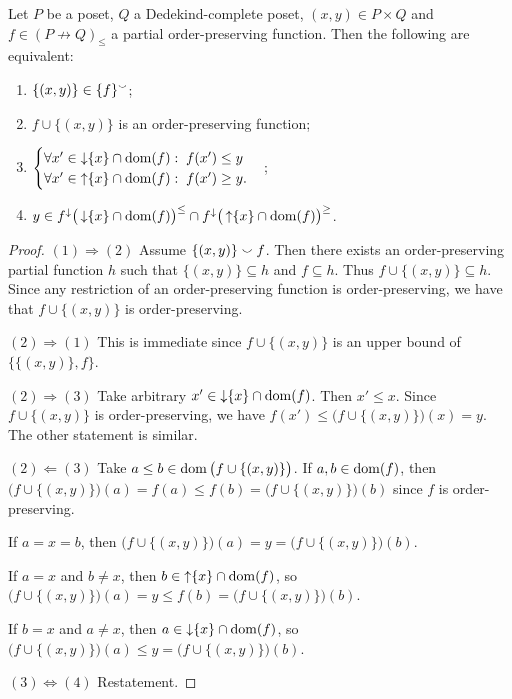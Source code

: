 \begin{lemma} \label{singletonConsistentWithIsotoneFunction}
Let $P$ be a poset, $Q$ a Dedekind-complete poset, $(x,y)\in P\times Q$ and $f\in (P\not\to Q)_\leq$ a partial order-preserving function. Then the following are equivalent:
\begin{enumerate}
\item $\{(x,y)\} \in \{f\}^\smallsmile$;
\item $f\cup \{(x,y)\}$ is an order-preserving function;
\item $ \begin{cases}
\forall x'\in \operatorname{\downarrow}\{x\} \cap \operatorname{dom}(f): \; f(x') \leq y \\
\forall x'\in \operatorname{\uparrow}\{x\} \cap \operatorname{dom}(f): \; f(x') \geq y.
\end{cases}$;
\item $y \in f^\downarrow\big(\operatorname{\downarrow} \{x\}\cap \operatorname{dom}(f)\big)^\leq \cap f^\downarrow\big(\operatorname{\uparrow} \{x\}\cap \operatorname{dom}(f)\big)^\geq$.
\end{enumerate}
\end{lemma}
\begin{proof}
$(1) \Rightarrow (2)$ Assume $\{(x,y)\} \smallsmile f$. Then there exists an order-preserving partial function $h$ such that $\{(x,y)\} \subseteq h$ and $f\subseteq h$. Thus $f\cup \{(x,y)\} \subseteq h$. Since any restriction of an order-preserving function is order-preserving, we have that $f\cup \{(x,y)\}$ is order-preserving.

$(2) \Rightarrow (1)$ This is immediate since $f\cup \{(x,y)\}$ is an upper bound of $\big\{\{(x,y)\}, f\big\}$.

$(2) \Rightarrow (3)$ Take arbitrary $x'\in \operatorname{\downarrow}\{x\} \cap \operatorname{dom}(f)$. Then $x'\leq x$. Since $f\cup \{(x,y)\}$ is order-preserving, we have $f(x') \leq \big(f\cup \{(x,y)\}\big)(x) = y$. The other statement is similar.

$(2) \Leftarrow (3)$ Take $a \leq b\in \operatorname{dom}\big(f\cup \{(x,y)\}\big)$. If $a,b\in \operatorname{dom}(f)$, then $\big(f\cup \{(x,y)\}\big)(a) = f(a) \leq f(b) = \big(f\cup \{(x,y)\}\big)(b)$ since $f$ is order-preserving.

If $a = x = b$, then $\big(f\cup \{(x,y)\}\big)(a) = y = \big(f\cup \{(x,y)\}\big)(b)$.

If $a = x$ and $b\neq x$, then $b\in \operatorname{\uparrow}\{x\} \cap \operatorname{dom}(f)$, so $\big(f\cup \{(x,y)\}\big)(a) = y \leq f(b) = \big(f\cup \{(x,y)\}\big)(b)$.

If $b = x$ and $a\neq x$, then $a\in \operatorname{\downarrow}\{x\} \cap \operatorname{dom}(f)$, so $\big(f\cup \{(x,y)\}\big)(a) \leq y = \big(f\cup \{(x,y)\}\big)(b)$.

$(3) \Leftrightarrow (4)$ Restatement.
\end{proof}
